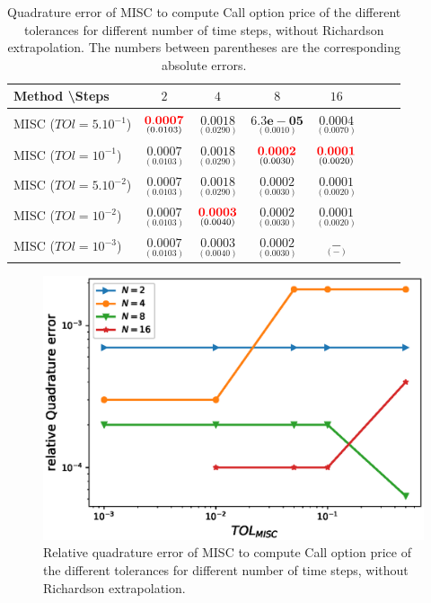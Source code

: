 \documentclass[11pt]{article}
\begin{document}
\begin{table}[h!]
	\centering
	\begin{tabular}{l*{6}{c}r}
		Method \textbackslash  Steps            & $2$ & $4$ & $8$ & $16$  \\
		\hline
		MISC ($TOl=5.10^{-1}$)  & $\underset{( 0.0103)}{\mathbf{{\color{red}0.0007}}}$ & $\underset{(0.0290)}{\mathbf{0.0018}}$  & $\underset{(0.0010
			)}{\mathbf{6.3e-05}}$ &$\underset{(   0.0070)}{\mathbf{0.0004}}$ \\
		MISC ($TOl=10^{-1}$)   &  $\underset{( 0.0103)}{\mathbf{0.0007}}$& $\underset{(0.0290)}{\mathbf{0.0018}}$ & $\underset{(
			0.0030
			)}{\mathbf{{\color{red}0.0002}}}$ &$\underset{(0.0020)}{\mathbf{{\color{red}0.0001}}}$ \\
		MISC ($TOl=5.10^{-2}$)  &$\underset{( 0.0103)}{\mathbf{0.0007}}$ & $\underset{(0.0290)}{\mathbf{0.0018}}$  & $\underset{(
			0.0030
			)}{\mathbf{0.0002}}$ &$\underset{(0.0020)}{\mathbf{0.0001}}$ \\
		MISC ($TOl=10^{-2}$)  & $\underset{( 0.0103)}{\mathbf{0.0007}}$ & $\underset{( 0.0040)}{\mathbf{{\color{red}0.0003}}}$  & $\underset{(
			0.0030
			)}{\mathbf{0.0002}}$ &$\underset{(0.0020)}{\mathbf{0.0001}}$ \\
		MISC ($TOl=10^{-3}$)  & $\underset{( 0.0103)}{\mathbf{0.0007}}$  & $\underset{( 0.0040)}{\mathbf{0.0003}}$ & $\underset{(
			0.0030
			)}{\mathbf{0.0002}}$ &$\underset{(-)}{\mathbf{-}}$ \\
		
		\hline
	\end{tabular}
	\caption{Quadrature error of MISC to compute Call option price of the different tolerances for different number of time steps, without Richardson extrapolation. The numbers between parentheses are the corresponding absolute errors.}
	\label{Quadrature error of MISC to compute Call option price of the different tolerances for different number of time steps, without Richardson extrapolation. The numbers between parentheses are the corresponding absolute errors.}
\end{table}


	\begin{figure}[h!]
\centering
\includegraphics[width=0.7\linewidth]{./figures/Call_MISC_quadrature_error/relative_quad_error_wrt_MISC_TOL_non_rich}


\caption{Relative quadrature error of MISC to compute Call option price of the different tolerances for different number of time steps, without Richardson extrapolation.}
\label{fig:Quadrature_error_non_rich_Call}
\end{figure}
\end{document}
